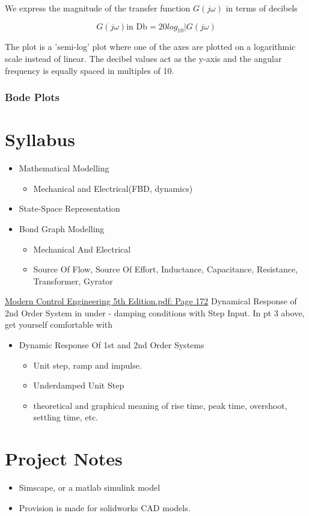 \documentclass[11pt]{report}
\begin{document}
We express the magnitude of the transfer function \(G(j \omega)\) in terms of decibels

$$G(j \omega) \text{in Db} = 20 log_{10}|G(j\omega)$$


The plot is a 'semi-log' plot where one of the axes are plotted on a logarithmic scale instead of linear. The decibel values act as the y-axis and the angular frequency is equally spaced in multiples of 10.
\section{Bode Plots}
\label{sec:org76f47c6}
\part{Syllabus}
\label{sec:org15778f2}

\begin{itemize}
\item Mathematical Modelling
\begin{itemize}
\item Mechanical and Electrical(FBD, dynamics)
\end{itemize}
\item State-Space Representation
\item Bond Graph Modelling
\begin{itemize}
\item Mechanical And Electrical
\item Source Of Flow, Source Of Effort, Inductance, Capacitance, Resistance, Transformer, Gyrator
\end{itemize}
\end{itemize}

\href{file:///home/adithya/university-notes/Modelling, Simulation And Analysis/textbooks/Modern Control Engineering 5th Edition.pdf}{Modern Control Engineering 5th Edition.pdf: Page 172}
Dynamical Response of 2nd Order System in under - damping conditions with Step Input.
In pt 3 above, get yourself comfortable with
\begin{itemize}
\item Dynamic Response Of 1st and 2nd Order Systems
\begin{itemize}
\item Unit step, ramp and impulse.
\item Underdamped Unit Step
\item theoretical and graphical meaning of rise time, peak time, overshoot, settling time, etc.
\end{itemize}
\end{itemize}
\part{Project Notes}
\label{sec:org902889f}
\begin{itemize}
\item Simscape, or a matlab simulink model
\item Provision is made for solidworks CAD models.
\end{itemize}
\end{document}
